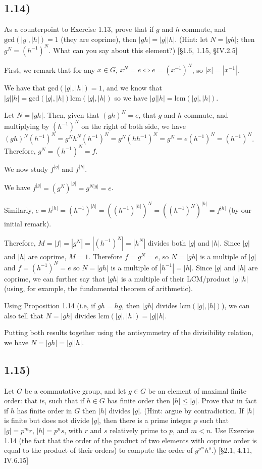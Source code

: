 \documentclass[12pt, letterpaper, twoside]{report}
\begin{document}
\subsection*{1.14)}

As a counterpoint to Exercise 1.13, prove that if $g$ and $h$ commute, and $\text{gcd}(|g|, |h|) = 1$ (they are coprime), then $|gh| = |g| |h|$. (Hint: let $N = |gh|$; then $g^N = (h^{-1})^N$. What can you say about this element?) [§1.6, 1.15, §IV.2.5]

First, we remark that for any $x \in G$, $x^N = e \Leftrightarrow e = (x^{-1})^N$, so $|x| = |x^{-1}|$.

We have that $\text{gcd}(|g|, |h|) = 1$, and we know that $|g| |h| = \text{gcd}(|g|, |h|) \text{lcm}(|g|, |h|)$ so we have $|g||h| = \text{lcm}(|g|, |h|)$.

Let $N = |gh|$. Then, given that $(gh)^N = e$, that $g$ and $h$ commute, and multiplying by $(h^{-1})^N$ on the right of both side, we have $(gh)^N(h^{-1})^N = g^N h^N (h^{-1})^N = g^N (hh^{-1})^N = g^N = e(h^{-1})^N = (h^{-1})^N$. Therefore, $g^N = (h^{-1})^N = f$.

We now study $f^{|g|}$ and $f^{|h|}$.

We have $f^{|g|} = (g^N)^{|g|} = g^{N|g|} = e$.

Similarly, $e = h^{|h|} = (h^{-1})^{|h|} = ((h^{-1})^{|h|})^N = ((h^{-1})^N)^{|h|} = f^{|h|}$ (by our initial remark).

Therefore, $M = |f| = |g^N| = |(h^{-1})^N| = |h^N|$ divides both $|g|$ and $|h|$. Since $|g|$ and $|h|$ are coprime, $M = 1$. Therefore $f = g^N = e$, so $N = |gh|$ is a multiple of $|g|$ and $f = (h^{-1})^N = e$ so $N = |gh|$ is a multiple of $|h^{-1}| = |h|$. Since $|g|$ and $|h|$ are coprime, we can further say that $|gh|$ is a multiple of their LCM/product $|g||h|$ (using, for example, the fundamental theorem of arithmetic).

Using Proposition 1.14 (i.e, if $gh = hg$, then $|gh|$ divides $\text{lcm}(|g|, |h|)$), we can also tell that $N = |gh|$ divides $\text{lcm}(|g|, |h|) = |g| |h|$.

Putting both results together using the antisymmetry of the divisibility relation, we have $N = |gh| = |g||h|$.



\subsection*{1.15)}

Let $G$ be a commutative group, and let $g \in G$ be an element of maximal finite order: that is, such that if $h \in G$ has finite order then $|h| \leq |g|$. Prove that in fact if $h$ has finite order in $G$ then $|h|$ divides $|g|$. (Hint: argue by contradiction. If $|h|$ is finite but does not divide $|g|$, then there is a prime integer $p$ such that $|g| = p^m r$, $|h| = p^n s$, with $r$ and $s$ relatively prime to $p$, and $m < n$. Use Exercise 1.14 (the fact that the order of the product of two elements with coprime order is equal to the product of their orders) to compute the order of $g^{p^m} h^s$.) [§2.1, 4.11, IV.6.15]
\end{document}
